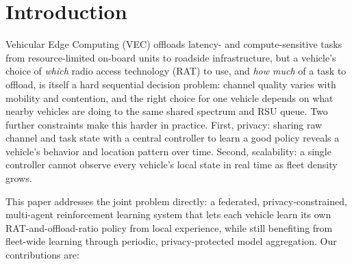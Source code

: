 \documentclass[10pt,twocolumn]{article}
\begin{document}
\section{Introduction}
Vehicular Edge Computing (VEC) offloads latency- and compute-sensitive tasks from resource-limited
on-board units to roadside infrastructure, but a vehicle's choice of \emph{which} radio access
technology (RAT) to use, and \emph{how much} of a task to offload, is itself a hard sequential
decision problem: channel quality varies with mobility and contention, and the right choice for
one vehicle depends on what nearby vehicles are doing to the same shared spectrum and RSU queue.
Two further constraints make this harder in practice. First, privacy: sharing raw channel and task
state with a central controller to learn a good policy reveals a vehicle's behavior and location
pattern over time. Second, scalability: a single controller cannot observe every vehicle's local
state in real time as fleet density grows.

This paper addresses the joint problem directly: a federated, privacy-constrained, multi-agent
reinforcement learning system that lets each vehicle learn its own RAT-and-offload-ratio policy
from local experience, while still benefiting from fleet-wide learning through periodic,
privacy-protected model aggregation. Our contributions are:
\end{document}
